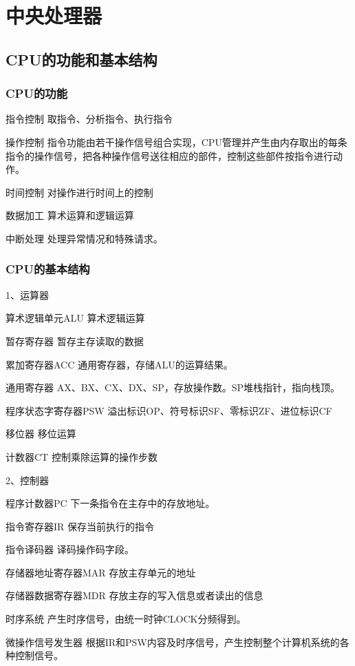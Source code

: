 \documentclass{ctexart}
\begin{document}
\section{中央处理器}

\subsection{CPU的功能和基本结构}

\subsubsection{CPU的功能}

指令控制
取指令、分析指令、执行指令

操作控制
指令功能由若干操作信号组合实现，CPU管理并产生由内存取出的每条指令的操作信号，把各种操作信号送往相应的部件，控制这些部件按指令进行动作。

时间控制
对操作进行时间上的控制

数据加工
算术运算和逻辑运算

中断处理
处理异常情况和特殊请求。

\subsubsection{CPU的基本结构}

1、运算器

算术逻辑单元ALU
算术逻辑运算

暂存寄存器
暂存主存读取的数据

累加寄存器ACC
通用寄存器，存储ALU的运算结果。

通用寄存器
AX、BX、CX、DX、SP，存放操作数。SP堆栈指针，指向栈顶。

程序状态字寄存器PSW
溢出标识OP、符号标识SF、零标识ZF、进位标识CF

移位器
移位运算

计数器CT
控制乘除运算的操作步数

2、控制器

程序计数器PC
下一条指令在主存中的存放地址。

指令寄存器IR
保存当前执行的指令

指令译码器
译码操作码字段。

存储器地址寄存器MAR
存放主存单元的地址

存储器数据寄存器MDR
存放主存的写入信息或者读出的信息

时序系统
产生时序信号，由统一时钟CLOCK分频得到。

微操作信号发生器
根据IR和PSW内容及时序信号，产生控制整个计算机系统的各种控制信号。
\end{document}
